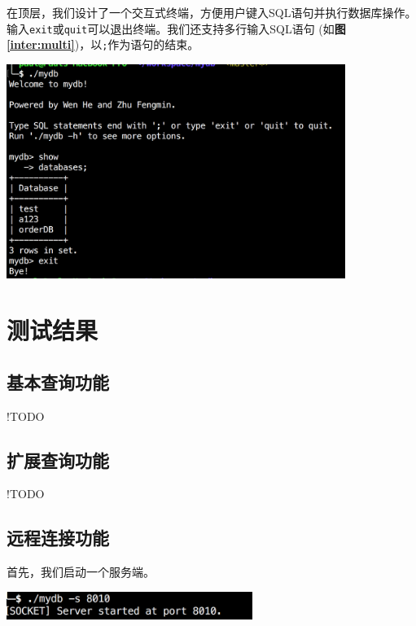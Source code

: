 \documentclass[11pt, a4paper]{article}
\makeatletter
\newcommand\fcaption{\def\@captype{figure}\caption}
\newcommand{\fref}[1]{\textbf{图\ref{#1}}}
\makeatother
\begin{document}
在顶层，我们设计了一个交互式终端，方便用户键入SQL语句并执行数据库操作。输入\texttt{exit}或\texttt{quit}可以退出终端。我们还支持多行输入SQL语句  (如\fref{inter:multi})，以\texttt{;}作为语句的结束。

\begin{center}
    \includegraphics[width=11cm]{fig/multi-row}
    \fcaption{交互式终端允许多行输入}\label{inter:multi}
\end{center}

\section{测试结果}

\subsection{基本查询功能}

!TODO

\subsection{扩展查询功能}

!TODO

\subsection{远程连接功能}

首先，我们启动一个服务端。

\begin{center}
    \includegraphics[width=8cm]{fig/server}
    \fcaption{启动服务端}
\end{center}
\end{document}
